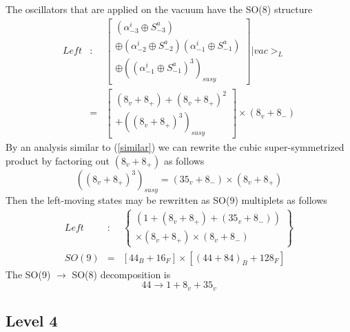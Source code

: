The oscillators that are applied on the vacuum have the SO(8) structure
\begin{eqnarray}
{Left} &:&\left[
\begin{array}{c}
(\alpha _{-3}^i\oplus S_{-3}^a) \\
\oplus (\alpha _{-2}^i\oplus S_{-2}^a)(\alpha _{-1}^i\oplus S_{-1}^a) \\
\oplus \left( (\alpha _{-1}^i\oplus S_{-1}^a)^3\right) _{susy}
\end{array}
\right] |{vac}>_L \\
\  &=&\left[
\begin{array}{c}
(8_v+8_{+})+(8_v+8_{+})^2 \\
+\left( (8_v+8_{+})^3\right) _{susy}
\end{array}
\right] \times (8_v+8_{-})  \nonumber
\end{eqnarray}
By an analysis similar to (\ref{similar}) we can rewrite the cubic
super-symmetrized product by factoring out $\left( 8_v+8_{+}\right) $ as
follows
\begin{equation}
\left( \left( 8_v+8_{+}\right) ^3\right) _{susy}=\left( 35_v+8_{-}\right)
\times \left( 8_v+8_{+}\right)   \label{cube}
\end{equation}
Then the left-moving states may be rewritten as SO(9) multiplets as follows
\begin{eqnarray}
{Left} &:&\left\{
\begin{array}{c}
\left( 1+\left( 8_v+8_{+}\right) +\left( 35_v+8_{-}\right) \right)  \\
\times \left( 8_v+8_{+}\right) \times \left( 8_v+8_{-}\right)
\end{array}
\right\}  \\
SO(9) &=&\left[ 44_B+16_F\right] \times \left[ \left( 44+84\right)
_B+128_F\right]   \nonumber
\end{eqnarray}
The SO(9) $\rightarrow $ SO(8) decomposition is
\begin{equation}
44\rightarrow 1+8_v+35_v
\end{equation}

\subsection{Level 4}

